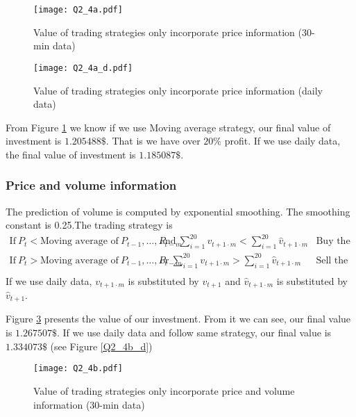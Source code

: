 \documentclass[11pt]{article}
\begin{document}
\begin{figure}
\texttt{[image: Q2\_4a.pdf]}
\caption{Value of trading strategies only incorporate price information (30-min data)}\label{Q2_4a}
\end{figure}

\begin{figure}
\texttt{[image: Q2\_4a\_d.pdf]}
\caption{Value of trading strategies only incorporate price information (daily data)}\label{Q2_4a_d}
\end{figure}

From Figure \ref{Q2_4a} we know if we use Moving average strategy, our final value of investment is $1.205488\$$. That is we have over $20\%$ profit. If we use daily data, the final value of investment is $1.185087\$$.
\subsubsection{Price and volume information}
The prediction of volume is computed by exponential smoothing. The smoothing constant is 0.25.The trading strategy is
\begin{eqnarray*}
\text{If}~P_t<\text{Moving average of}~P_{t-1},\ldots,P_{t-m}&
\text{and}~\sum_{i=1}^{20} v_{t+1\cdot m}<\sum_{i=1}^{20} \hat{v}_{t+1\cdot m}&\text{Buy the stock}\\
\text{If}~P_t>\text{Moving average of}~P_{t-1},\ldots,P_{t-m}&
\text{or}~\sum_{i=1}^{20} v_{t+1\cdot m}>\sum_{i=1}^{20} \hat{v}_{t+1\cdot m}&\text{Sell the stock}\\
\end{eqnarray*}
If we use daily data, $v_{t+1\cdot m}$ is substituted by $v_{t+1}$ and $\hat{v}_{t+1\cdot m}$ is substituted by $\hat{v}_{t+1}$.

Figure \ref{Q2_4b} presents the value of our investment. From it we can see, our final value is $1.267507\$$. If we use daily data and follow same strategy, our final value is $1.334073\$$ (see Figure \ref{Q2_4b_d})

\begin{figure}
\texttt{[image: Q2\_4b.pdf]}
\caption{Value of trading strategies only incorporate price and volume information (30-min data)}\label{Q2_4b}
\end{figure}
\end{document}
